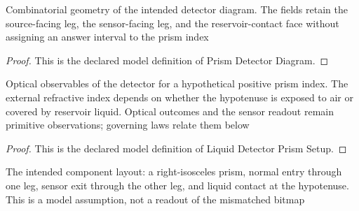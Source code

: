 \begin{definition}
  \label{def:physics:phyx-mini-0147:phyxminiproblems-problemphyxmini0147-prismdetectordiagram}
  Combinatorial geometry of the intended detector diagram. The fields retain the source-facing leg, the sensor-facing leg, and the reservoir-contact face without assigning an answer interval to the prism index
\end{definition}
\begin{proof}
  This is the declared model definition of Prism Detector Diagram.
\end{proof}
\begin{definition}
  \label{def:physics:phyx-mini-0147:phyxminiproblems-problemphyxmini0147-liquiddetectorprismsetup}
  Optical observables of the detector for a hypothetical positive prism index. The external refractive index depends on whether the hypotenuse is exposed to air or covered by reservoir liquid. Optical outcomes and the sensor readout remain primitive observations; governing laws relate them below
\end{definition}
\begin{proof}
  This is the declared model definition of Liquid Detector Prism Setup.
\end{proof}
\begin{definition}
  \label{def:physics:phyx-mini-0147:phyxminiproblems-problemphyxmini0147-matchesintendeddetectorlayout}
  The intended component layout: a right-isosceles prism, normal entry through one leg, sensor exit through the other leg, and liquid contact at the hypotenuse. This is a model assumption, not a readout of the mismatched bitmap
\end{definition}
